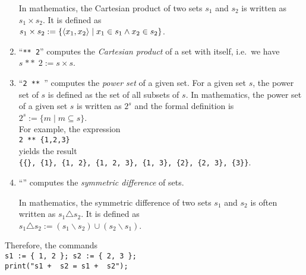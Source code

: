 \begin{enumerate}
      In mathematics, the Cartesian product of two sets $s_1$ and $s_2$ is written
      as $s_1 \times s_2$.  It is defined as
      \\[0.2cm]
      \hspace*{1.3cm}
      $s_1 \times s_2 := \{ \pair(x_1,x_2) \mid x_1 \in s_1 \wedge x_2 \in s_2 \}$.
\item ``\texttt{** 2}'' computes the \emph{Cartesian product} of a set with itself,
      i.e.~we have 
      \\[0.2cm]
      \hspace*{1.3cm}
      $s \;\mathtt{**}\; 2 := s \times s$.
\item ``\texttt{2 ** }'' computes the \emph{power set} of a given set.  For a given set
      $s$, the power set of $s$ is defined as the set of all subsets of $s$.
      In mathematics, the power set of a given set $s$ is written as $2^s$ and the formal
      definition is
      \\[0.2cm]
      \hspace*{1.3cm}
      $2^s := \{ m \mid m \subseteq s \}$.
      \\[0.2cm]
      For example, the expression
      \\[0.2cm]
      \hspace*{1.3cm}
      \texttt{2 ** \{1,2,3\}}
      \\[0.2cm]
      yields the result
      \\[0.2cm]
      \hspace*{1.3cm}
      \texttt{\{\{\}, \{1\}, \{1, 2\}, \{1, 2, 3\}, \{1, 3\}, \{2\}, \{2, 3\}, \{3\}\}}.
\item ``\texttt{}'' computes the \emph{symmetric difference} of sets.

      In mathematics, the symmetric difference of two sets $s_1$ and $s_2$ is often written
      as $s_1 \triangle s_2$.  It is defined as
      \\[0.2cm]
      \hspace*{1.3cm}
      $s_1 \triangle s_2 := (s_1 \backslash s_2) \cup (s_2 \backslash s_1)$.
\end{enumerate}
Therefore, the commands
\\[0.2cm]
\hspace*{1.3cm}
\texttt{s1 := \{ 1, 2 \}; s2 := \{ 2, 3 \};}
\\
\hspace*{1.3cm}
\texttt{print("s1 + \ s2 = s1 + \ s2");}
\\
\hspace*{1.3cm}
